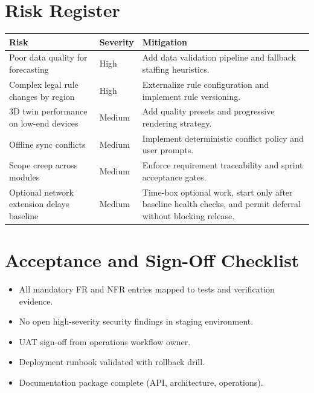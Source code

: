 \documentclass[11pt,a4paper]{article}
\newcommand{\thead}[1]{\textcolor{HeaderText}{\textbf{#1}}}
\begin{document}
\section{Risk Register}
\begin{tabularx}{\textwidth}{P{0.18\textwidth}P{0.16\textwidth}Y}
\toprule
{}
\thead{Risk} & \thead{Severity} & \thead{Mitigation} \\
\midrule
Poor data quality for forecasting & High & Add data validation pipeline and fallback staffing heuristics. \\
Complex legal rule changes by region & High & Externalize rule configuration and implement rule versioning. \\
3D twin performance on low-end devices & Medium & Add quality presets and progressive rendering strategy. \\
Offline sync conflicts & Medium & Implement deterministic conflict policy and user prompts. \\
Scope creep across modules & Medium & Enforce requirement traceability and sprint acceptance gates. \\
Optional network extension delays baseline & Medium & Time-box optional work, start only after baseline health checks, and permit deferral without blocking release. \\
\bottomrule
\end{tabularx}

\section{Acceptance and Sign-Off Checklist}
\begin{itemize}
  \item All mandatory FR and NFR entries mapped to tests and verification evidence.
  \item No open high-severity security findings in staging environment.
  \item UAT sign-off from operations workflow owner.
  \item Deployment runbook validated with rollback drill.
  \item Documentation package complete (API, architecture, operations).
\end{itemize}
\end{document}
